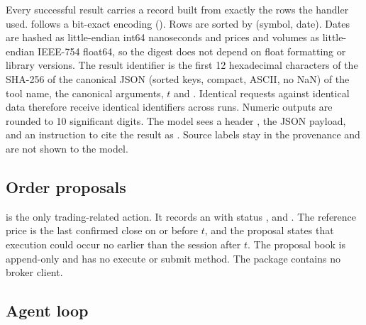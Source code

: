 Every successful result carries a  record built from exactly
the rows the handler used.  follows a bit-exact encoding
(). Rows are sorted by (symbol, date). Dates are hashed as
little-endian int64 nanoseconds and prices and volumes as little-endian IEEE-754
float64, so the digest does not depend on float formatting or library
versions. The result identifier is the first 12 hexadecimal characters of the
SHA-256 of the canonical JSON (sorted keys, compact, ASCII, no NaN) of the
tool name, the canonical arguments, $t$ and . Identical
requests against identical data therefore receive identical identifiers across
runs. Numeric outputs are rounded to 10 significant digits. The model sees a
header , the JSON payload, and an instruction to cite the result
as \code{[r:<id>]}. Source labels stay in the provenance and are not shown to
the model.

\subsection{Order proposals}
\label{sec:proposals}

 is the only trading-related action. It records an
 with status ,
 and . The
reference price is the last confirmed close on or before $t$, and the proposal
states that execution could occur no earlier than the session after $t$. The
proposal book is append-only and has no execute or submit method. The package
contains no broker client.

\subsection{Agent loop}
\label{sec:loop}

